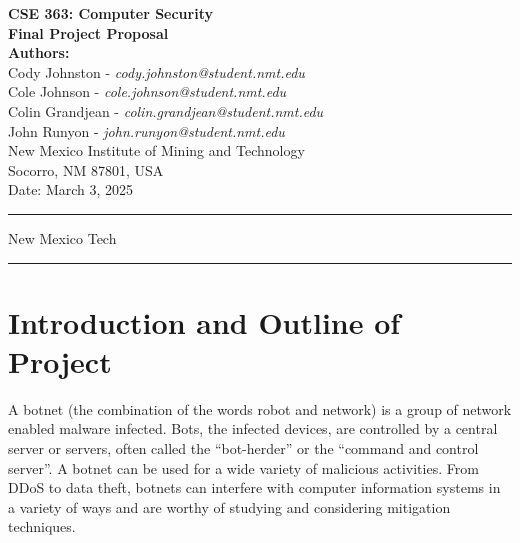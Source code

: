 \documentclass[english,12pt]{article}
\begin{document}
\begin{titlepage}
    \null
    \vspace*{2cm}
    
    \begin{center}
        {\Huge \bfseries CSE 363: Computer Security}\\[1.5cm]
        {\Large \bfseries Final Project Proposal}\\[2cm]
        
        \textbf{Authors:} \\[0.5cm]
        Cody Johnston - \textit{cody.johnston@student.nmt.edu}\\
        Cole Johnson - \textit{cole.johnson@student.nmt.edu}\\
        Colin Grandjean - \textit{colin.grandjean@student.nmt.edu}\\
        John Runyon - \textit{john.runyon@student.nmt.edu}\\
        
        New Mexico Institute of Mining and Technology\\
        Socorro, NM 87801, USA\\[2cm]
        
        {\large Date: March 3, 2025}
    \end{center}
    
    \vfill
    \hrule
    \smallskip
    \centerline{\sc New Mexico Tech}
    \smallskip
    \hrule
\end{titlepage}
\frenchspacing
\pagebreak
\section*{Introduction and Outline of Project}
A botnet (the combination of the words robot and network) is a group of network
enabled malware infected. Bots, the infected devices, are controlled by a central
server or servers, often called the “bot-herder” or the “command and control server”.
A botnet can be used for a wide variety of malicious activities. From DDoS to data
theft, botnets can interfere with computer information systems in a variety of ways
and are worthy of studying and considering mitigation techniques.
\end{document}
